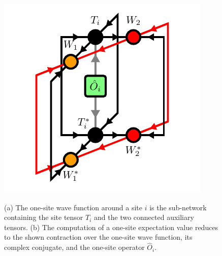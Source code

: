 \begin{figure}
	\centering
	\subcaptionbox{\label{fig:YB_isoTPS_onesite_expectation_value_environment}}
	{%
		\usebox{\largestimage}
	}
	\quad\quad
	\subcaptionbox{\label{fig:YB_isoTPS_onesite_expectation_value_computation}}
	{%
		\raisebox{\dimexpr.5\ht\largestimagea-.5\height}
		{%
			\includegraphics[scale=1.0]{figures/tikz/YB_isoTPS/one_site_expectation_value/one_site_expectation_value_b.pdf}
		}
	}
	\caption{(a) The one-site wave function around a site $i$ is the sub-network containing the site tensor $T_i$ and the two connected auxiliary tensors. (b) The computation of a one-site expectation value reduces to the shown contraction over the one-site wave function, its complex conjugate, and the one-site operator $\hat{O}_i$.}
	\label{fig:YB_isoTPS_onesite_expectation_value}
\end{figure}
